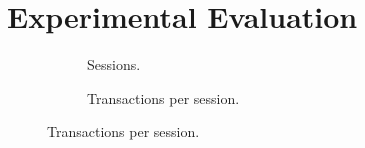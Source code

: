 
\section{Experimental Evaluation}\label{sec:exp}

\begin{figure}
\centering
 \begin{subfigure}{.33\textwidth}
  \caption{Sessions.}
  \label{ser_node_scale}
 \end{subfigure}
 \hspace{-3mm}
 \begin{subfigure}{.33\textwidth}
  \caption{Transactions per session.}
  \label{ser_transaction_scale}
 \end{subfigure}


\end{figure}

